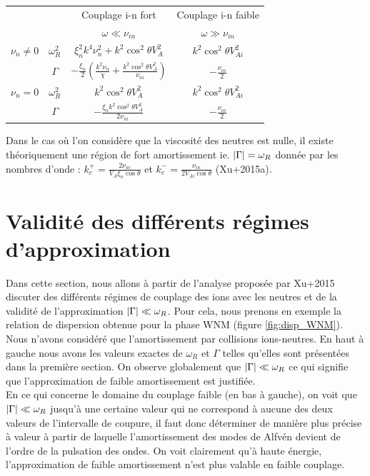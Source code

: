 \documentclass[10pt,a4paper]{article}
\begin{document}
\begin{center}
\begin{tabular}{|c|c|c|c|}
\hline 
 & & Couplage i-n fort & Couplage i-n faible \\ 
 
& & $\omega \ll \nu_{in}$ & $\omega \gg \nu_{in}$ \\ 
\hline 
$\nu_n \neq 0$ &$\omega_R^2$ & $\xi_n^2k^4\nu_n^2 + k^2\cos^2\theta V_{A}^2$ & $k^2\cos^2\theta V_{Ai}^2$ \\ 

&$\Gamma$ & $- \frac{\xi_n}{2}\left( \frac{k^2 \nu_n}{\chi} + \frac{k^2 \cos^2\theta V_{A}^2 }{\nu_{ni}} \right)$ & $-\frac{\nu_{in}}{2}$ \\ 
\hline
$\nu_n = 0$ &$\omega_R^2$ & $k^2\cos^2\theta V_{A}^2$ & $k^2\cos^2\theta V_{Ai}^2$ \\

&$\Gamma$ & $-\frac{\xi_n k^2 \cos^2\theta V_{A}^2 }{2\nu_{ni}}$ & $-\frac{\nu_{in}}{2}$ \\

\hline 
\end{tabular}
\end{center} 

Dans le cas où l'on considère que la viscosité des neutres est nulle, il existe théoriquement une région de fort amortissement ie. $\abs{\Gamma} = \omega_R$  donnée par les nombres d'onde : $k_c^+ = \frac{2\nu_{ni}}{V_A\xi_n \cos\theta}$ et $k_c^- = \frac{\nu_{in}}{2V_{Ai}\cos\theta}$ (Xu+2015a). 

\section{Validité des différents régimes d'approximation} 
Dans cette section, nous allons à partir de l'analyse proposée par Xu+2015 discuter des différents régimes de couplage des ions avec les neutres et de la validité de l'approximation $\abs{\Gamma} \ll \omega_R$. Pour cela, nous prenons en exemple la relation de dispersion obtenue pour la phase WNM (figure \ref{fig:disp_WNM}). Nous n'avons considéré que l'amortissement par collisions ions-neutres. En haut à gauche nous avons les valeurs exactes de $\omega_R$ et $\Gamma$ telles qu'elles sont présentées dans la première section. On observe globalement que $\abs{\Gamma} \ll \omega_R$ ce qui signifie que l'approximation de faible amortissement est justifiée. \\ 

En ce qui concerne le domaine du couplage faible (en bas à gauche), on voit que $\abs{\Gamma} \ll \omega_R$ jusqu'à une certaine valeur qui ne correspond à aucune des deux valeurs de l'intervalle de coupure, il faut donc déterminer de manière plus précise à valeur à partir de laquelle l'amortissement des modes de Alfvén devient de l'ordre de la pulsation des ondes. On voit clairement qu'à haute énergie, l'approximation de faible amortissement n'est plus valable en faible couplage. \\ 
\end{document}
